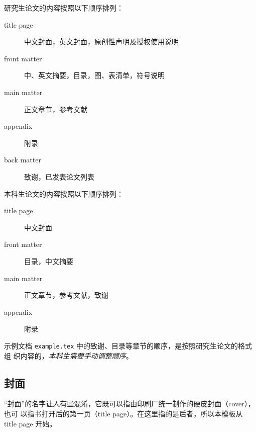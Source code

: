 \documentclass[a4paper]{ltxdoc}
\DeclareRobustCommand\file{\nolinkurl}
\begin{document}
研究生论文的内容按照以下顺序排列：
\begin{description}
  \item[title page] 中文封面，英文封面，原创性声明及授权使用说明
  \item[front matter] 中、英文摘要，目录，图、表清单，符号说明
  \item[main matter] 正文章节，参考文献
  \item[appendix] 附录
  \item[back matter] 致谢，已发表论文列表
\end{description}

本科生论文的内容按照以下顺序排列：
\begin{description}
  \item[title page] 中文封面
  \item[front matter] 目录，中文摘要
  \item[main matter] 正文章节，参考文献，致谢
  \item[appendix] 附录
\end{description}

示例文档 \file{example.tex} 中的致谢、目录等章节的顺序，是按照研究生论文的格式组
织内容的，\emph{本科生需要手动调整顺序}。


\subsection{封面}

“封面”的名字让人有些混淆，它既可以指由印刷厂统一制作的硬皮封面（cover），也可
以指书打开后的第一页（title page）。在这里指的是后者，所以本模板从 title page
开始。
\end{document}
